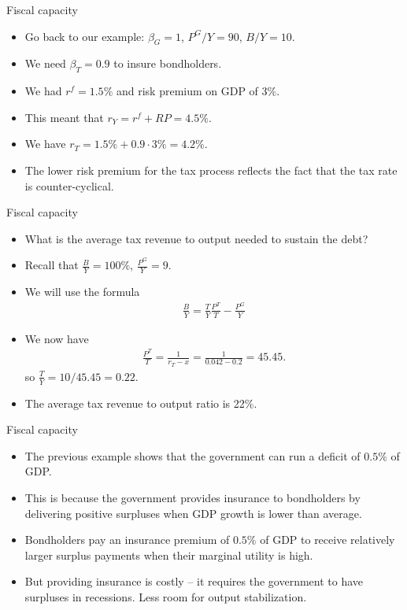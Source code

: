 \documentclass[11pt,xcolor={dvipsnames},aspectratio=159,hyperref={pdftex,pdfpagemode=UseNone,hidelinks,pdfdisplaydoctitle=true},usepdftitle=false]{beamer}
\begin{document}
\begin{frame}{Fiscal capacity}  
    \begin{itemize}
    \item Go back to our example: $\beta_G = 1$, $P^G/Y = 90$, $B/Y=10$.
    \item We need $\beta_T = 0.9$ to insure bondholders.
    \item We had $r^f = 1.5\%$ and risk premium on GDP of 3\%.
    \item This meant that $r_Y = r^f + RP = 4.5\%$.
    \item We have $r_T = 1.5\% + 0.9 \cdot 3\% = 4.2\%$.
    \item The lower risk premium for the tax process reflects the fact that the tax rate is
    counter-cyclical.
    \end{itemize}
\end{frame}

\begin{frame}{Fiscal capacity}  
    \begin{itemize}
    \item What is the average tax revenue to output needed to sustain the debt?
    \item Recall that $\frac{B}{Y} = 100\%$, $\frac{P^G}{Y} = 9$.
    \item We will use the formula \begin{align*}
        \frac{B}{Y} = \frac{T}{Y} \frac{P^T}{T}  - \frac{P^G}{Y}
    \end{align*}
    \item We now have \begin{align*}
    \frac{P^T}{T} = \frac{1}{r_T - x} = \frac{1}{0.042-0.2} = 45.45.  
    \end{align*}
    so $\frac{T}{Y} = 10 / 45.45 = 0.22$.
    \item The average tax revenue to output ratio is 22\%.
    \end{itemize}
\end{frame}

\begin{frame}{Fiscal capacity}  
    \begin{itemize}
    \item The previous example shows that the government can  run a deficit of $0.5\%$ of GDP.
    \item This is because the government provides insurance
    to bondholders by delivering positive surpluses when GDP growth is lower than average.
    \item Bondholders pay an insurance premium of $0.5\%$ of GDP to receive relatively larger surplus payments when their marginal utility is high.
    \item But providing insurance is costly -- it requires the government to have surpluses in recessions. Less room for output stabilization.
    \end{itemize}
\end{frame}
\end{document}
